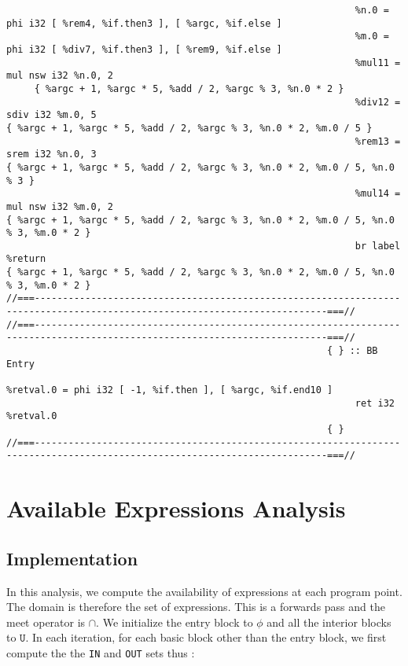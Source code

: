 \begin{verbatim}
                                                              %n.0 = phi i32 [ %rem4, %if.then3 ], [ %argc, %if.else ]
                                                              %m.0 = phi i32 [ %div7, %if.then3 ], [ %rem9, %if.else ]
                                                              %mul11 = mul nsw i32 %n.0, 2
     { %argc + 1, %argc * 5, %add / 2, %argc % 3, %n.0 * 2 }
                                                              %div12 = sdiv i32 %m.0, 5
{ %argc + 1, %argc * 5, %add / 2, %argc % 3, %n.0 * 2, %m.0 / 5 }
                                                              %rem13 = srem i32 %n.0, 3
{ %argc + 1, %argc * 5, %add / 2, %argc % 3, %n.0 * 2, %m.0 / 5, %n.0 % 3 }
                                                              %mul14 = mul nsw i32 %m.0, 2
{ %argc + 1, %argc * 5, %add / 2, %argc % 3, %n.0 * 2, %m.0 / 5, %n.0 % 3, %m.0 * 2 }
                                                              br label %return
{ %argc + 1, %argc * 5, %add / 2, %argc % 3, %n.0 * 2, %m.0 / 5, %n.0 % 3, %m.0 * 2 }
//===--------------------------------------------------------------------------------------------------------------------------===//
//===--------------------------------------------------------------------------------------------------------------------------===//
                                                         { } :: BB Entry
                                                              %retval.0 = phi i32 [ -1, %if.then ], [ %argc, %if.end10 ]
                                                              ret i32 %retval.0
                                                         { }
//===--------------------------------------------------------------------------------------------------------------------------===//
\end{verbatim}
\endgroup

\section{Available Expressions Analysis}

\subsection{Implementation}

In this analysis, we compute the availability of expressions at each program point.
The domain is therefore the set of expressions.
This is a forwards pass and the meet operator is $\cap$.
We initialize the entry block to $\phi$  and all the interior blocks to $\mathtt{U}$.
In each iteration, for each basic block other than the entry block, we
first compute the the \texttt{IN} and \texttt{OUT} sets thus :

